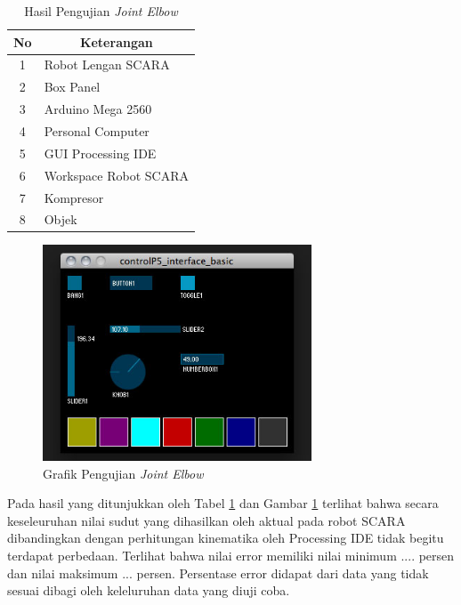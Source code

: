  \begin{table}[H]
 	\centering
 	\caption{Hasil Pengujian \textit{Joint Elbow}}
 	\label{tbl.jointelbow}
 	\begin{tabular}{|c|l|}
 		\hline
 		\rowcolor[HTML]{9B9B9B} 
 		
 		No & \multicolumn{1}{c|}{\cellcolor[HTML]{9B9B9B}Keterangan} \\ \hline
 		1  & Robot Lengan SCARA                                      \\ \hline
 		2  & Box Panel                                               \\ \hline
 		3  & Arduino Mega 2560                                       \\ \hline
 		4  & Personal Computer                                       \\ \hline
 		5  & GUI Processing IDE                                      \\ \hline
 		6  & Workspace Robot SCARA                                   \\ \hline
 		7  & Kompresor                                               \\ \hline
 		8  & Objek                                                   \\ \hline
 	\end{tabular}
 	
 \end{table} 
 \begin{figure}[H]
 	\centering
 	\includegraphics[width=8cm]{gambar/controlp5.jpg}
 	\caption{Grafik Pengujian \textit{Joint Elbow}}
 	\label{pic.jointelbow}
 \end{figure}
 
 Pada hasil yang ditunjukkan oleh Tabel \ref{tbl.jointelbow} dan Gambar \ref{pic.jointelbow} terlihat bahwa secara keseleuruhan nilai sudut yang dihasilkan oleh aktual pada robot SCARA dibandingkan dengan perhitungan kinematika oleh Processing IDE tidak begitu terdapat perbedaan. Terlihat bahwa nilai error
 memiliki nilai minimum .... persen dan nilai maksimum ... persen. Persentase error didapat dari data yang tidak sesuai dibagi oleh keleluruhan data yang diuji coba. 
